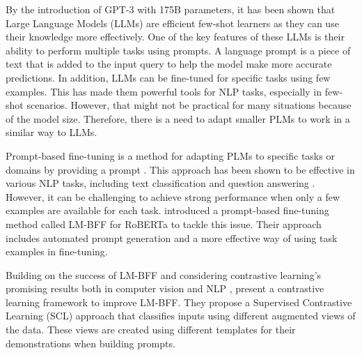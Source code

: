 \documentclass[11pt]{article}
\begin{document}
By the introduction of GPT-3 \cite{https://doi.org/10.48550/arxiv.2005.14165} with 175B parameters, it has been shown that Large Language Models (LLMs) are efficient few-shot learners as they can use their knowledge more effectively. One of the key features of these LLMs is their ability to perform multiple tasks using prompts. A language prompt is a piece of text that is added to the input query to help the model make more accurate predictions. In addition, LLMs can be fine-tuned for specific tasks using few examples. This has made them powerful tools for NLP tasks, especially in few-shot scenarios. However, that might not be practical for many situations because of the model size. Therefore, there is a need to adapt smaller PLMs to work in a similar way to LLMs.

Prompt-based fine-tuning is a method for adapting PLMs to specific tasks or domains by providing a prompt \cite{schick2020exploiting, schick2020s}. This approach has been shown to be effective in various NLP tasks, including text classification \cite{https://doi.org/10.48550/arxiv.2105.11259, https://doi.org/10.48550/arxiv.2205.05313} and question answering \cite{yao2022prompt}. However, it can be challenging to achieve strong performance when only a few examples are available for each task.  introduced a prompt-based fine-tuning method called LM-BFF for RoBERTa \cite{liu2019roberta} to tackle this issue. Their approach includes automated prompt generation and a more effective way of using task examples in fine-tuning.

Building on the success of LM-BFF and considering contrastive learning's promising results both in computer vision \cite{chen2020simple} and NLP \cite{chen2020simple, miao2021simple},  present a contrastive learning framework to improve LM-BFF. They propose a Supervised Contrastive Learning (SCL) approach \cite{khosla2020supervised} that classifies inputs using different augmented views of the data. These views are created using different templates for their demonstrations when building prompts.
\end{document}

